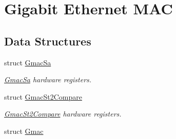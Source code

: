 \hypertarget{group__SAME70__GMAC}{}\section{Gigabit Ethernet M\+AC}
\label{group__SAME70__GMAC}
\subsection*{Data Structures}
\begin{DoxyCompactItemize}
\item 
struct \mbox{\hyperlink{structGmacSa}{Gmac\+Sa}}
\begin{DoxyCompactList}\small\item\em \mbox{\hyperlink{structGmacSa}{Gmac\+Sa}} hardware registers. \end{DoxyCompactList}\item 
struct \mbox{\hyperlink{structGmacSt2Compare}{Gmac\+St2\+Compare}}
\begin{DoxyCompactList}\small\item\em \mbox{\hyperlink{structGmacSt2Compare}{Gmac\+St2\+Compare}} hardware registers. \end{DoxyCompactList}\item 
struct \mbox{\hyperlink{structGmac}{Gmac}}
\end{DoxyCompactItemize}
